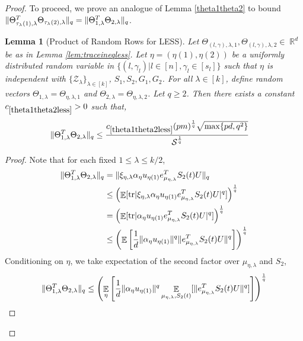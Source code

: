 \documentclass[11pt]{amsart}
\numberwithin{equation}{section}
\numberwithin{equation}{section}
\DeclareMathOperator{\E}{\mathbb{E}}
\DeclareMathOperator{\R}{\mathbb{R}}
\DeclareMathOperator*{\tr}{tr}
\DeclarePairedDelimiter{\norm}{\lVert}{\rVert}
\DeclarePairedDelimiter{\abs}{\lvert}{\rvert}
\newtheorem{lemma}[theorem]{Lemma}
\theoremstyle{remark}
\theoremstyle{definition}
\begin{document}
\begin{proof}
To proceed, we prove an analogue of Lemma \ref{theta1theta2} to bound $\norm{\Theta_{\tau_\lambda(1),\lambda}^T\Theta_{\tau_\lambda(2),\lambda}}_{q} = \norm{\Theta_{1,\lambda}^T\Theta_{2,\lambda}}_{q}$.

\begin{lemma}[Product of Random Rows for LESS] \label{theta1theta2less}
Let $\Theta_{(l,\gamma), \lambda, 1}, \Theta_{(l,\gamma), \lambda, 2} \in \R^d$ be as in Lemma \ref{lem:traceineqless}. Let $\eta = (\eta(1), \eta(2))$ be a uniformly distributed random variable in $\{ (l, \gamma_l) | l \in [n], \gamma_l \in [s_l] \}$ such that $\eta$ is independent with $\{\mathcal{Z}_{\lambda}\}_{\lambda \in [k]}$, $S_1, S_2, G_1, G_2$. For all $\lambda \in [k]$, define random vectors $\Theta_{1, \lambda} = \Theta_{\eta, \lambda, 1}$ and $\Theta_{2, \lambda} = \Theta_{\eta, \lambda, 2}$. Let $q \ge 2$. Then there exists a constant $c_{\ref*{theta1theta2less}} >0$ such that,
\begin{align*}
\norm{\Theta_{1,\lambda}^T\Theta_{2,\lambda}}_{q} &\le  \frac{ c_{\ref*{theta1theta2less}}(pm)^\frac{1}{q}\sqrt{\max \{ pd, q^2 \}} }{\mathcal{S}^\frac{1}{q}}
\end{align*}
\end{lemma}

\begin{proof}

Note that for each fixed $1 \le \lambda \le k/2$, 
\begin{align*}
    \norm{\Theta_{1,\lambda}^T\Theta_{2,\lambda}}_{q} &= \norm{\xi_{\eta, \lambda}\alpha_{\eta} u_{\eta(1)} e_{\mu_{\eta,\lambda}}^TS_2(t)U}_{q} \\
    &\le \left( \E [\tr \abs{\xi_{\eta, \lambda}\alpha_{\eta} u_{\eta(1)} e_{\mu_{\eta,\lambda}}^TS_2(t)U}^{q} ] \right)^\frac{1}{q} \\
    &= \left( \E [\tr \abs{\alpha_{\eta} u_{\eta(1)} e_{\mu_{\eta,\lambda}}^TS_2(t)U}^{q} ] \right)^\frac{1}{q} \\
    &\le \left( \E \left[ \frac{1}{d} \norm{\alpha_{\eta} u_{\eta(1)} }^{q}\norm{e_{\mu_{\eta,\lambda}}^TS_2(t)U}^{q} \right] \right)^\frac{1}{q} \\
\end{align*} 
Conditioning on $\eta$, we take expectation of the second factor over $\mu_{\eta, \lambda}$ and $S_2$,
\begin{align*}
    \norm{\Theta_{1,\lambda}^T\Theta_{2,\lambda}}_{q} &\le \left( \E_{\eta} \left[ \frac{1}{d} \norm{\alpha_{\eta} u_{\eta(1)} }^{q} \E_{\mu_{\eta, \lambda}, S_2(t)}[ \norm{e_{\mu_{\eta,\lambda}}^TS_2(t)U}^{q}] \right] \right)^\frac{1}{q} \\
\end{align*}


\end{proof}
\end{proof}
\end{document}
